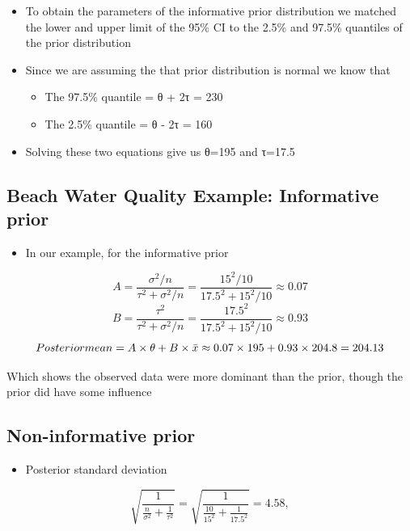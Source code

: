 \documentclass[
]{book}
\providecommand{\tightlist}{%
  \setlength{\itemsep}{0pt}\setlength{\parskip}{0pt}}
\begin{document}
\begin{itemize}
\tightlist
\item
  To obtain the parameters of the informative prior distribution we matched the lower and upper limit of the 95\% CI to the 2.5\% and 97.5\% quantiles of the prior distribution
\item
  Since we are assuming the that prior distribution is normal we know that

  \begin{itemize}
  \tightlist
  \item
    The 97.5\% quantile = θ + 2τ = 230
  \item
    The 2.5\% quantile = θ - 2τ = 160
  \end{itemize}
\item
  Solving these two equations give us θ=195 and τ=17.5
\end{itemize}

\hypertarget{beach-water-quality-example-informative-prior}{%
\subsection{Beach Water Quality Example: Informative prior}\label{beach-water-quality-example-informative-prior}}

\begin{itemize}
\tightlist
\item
  In our example, for the informative prior
\end{itemize}

\[A=\frac{\sigma^2/n}{\tau^2+\sigma^2/n}=\frac{15^2/10}{17.5^2+15^2/10}\approx 0.07\]
\[B = \frac{\tau^2}{\tau^2+\sigma^2/n}=\frac{17.5^2}{17.5^2+15^2/10}\approx 0.93\]
\[Posterior\space mean=A\times\theta+B\times\bar x\approx0.07\times 195+0.93\times204.8=204.13\]

Which shows the observed data were more dominant than the prior, though the prior did have some influence

\hypertarget{non-informative-prior}{%
\subsection{Non-informative prior}\label{non-informative-prior}}

\begin{itemize}
\tightlist
\item
  Posterior standard deviation
\end{itemize}

\[\sqrt{\frac{1}{\frac{n}{\sigma^2}+\frac{1}{\tau^2}}}=\sqrt{\frac{1}{\frac{10}{15^2}+\frac{1}{17.5^2}}}=4.58,\]
\end{document}
